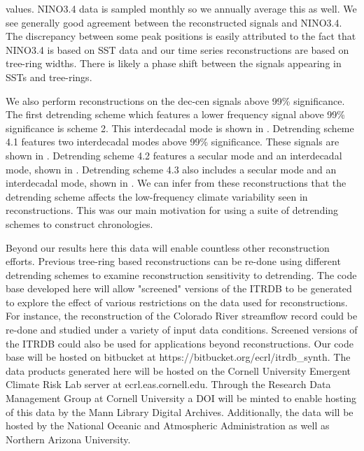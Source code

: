 \documentclass[phd,tocprelim]{cornell}
\begin{document}
values. NINO3.4 data is sampled monthly so we annually average this as well. 
We see generally good agreement between the reconstructed signals 
and NINO3.4. The discrepancy between some peak positions is easily 
attributed to the fact that NINO3.4 is based on SST data and our time 
series reconstructions are based on tree-ring widths. There is likely a 
phase shift between the signals appearing in SSTs and tree-rings. 
\par
We also perform reconstructions on the dec-cen signals above 99\% 
significance. The first detrending scheme which features a lower 
frequency signal above 99\% significance is scheme 2. This interdecadal 
mode is shown in . 
Detrending scheme 4.1 features 
two interdecadal modes above 99\% significance. These signals are shown 
in . 
Detrending scheme 4.2 features a secular mode and an interdecadal mode, 
shown in 
. 
Detrending scheme 4.3 also includes a secular mode and an interdecadal 
mode, shown in 
. 
We can infer from these reconstructions that the detrending scheme 
affects the low-frequency climate variability seen in reconstructions. 
This was our main motivation for using a suite of detrending schemes 
to construct chronologies. 

\par
Beyond our results here this data will enable countless 
other reconstruction efforts. Previous tree-ring based 
reconstructions can be re-done using different detrending 
schemes to examine reconstruction sensitivity to detrending. 
The code base developed here will allow "screened" versions 
of the ITRDB to be generated to explore the effect of 
various restrictions on the data used for reconstructions. 
For instance, the reconstruction of the Colorado River 
streamflow record could be re-done and studied under a variety 
of input data conditions. Screened versions of the ITRDB 
could also be used for applications beyond reconstructions. 
Our code base will be hosted on bitbucket at 
https://bitbucket.org/ecrl/itrdb\_synth. The data products 
generated here will be hosted on the Cornell University 
Emergent Climate Risk Lab server at ecrl.eas.cornell.edu. Through 
the Research Data Management Group at Cornell University a DOI 
will be minted to enable hosting of this data by the Mann 
Library Digital Archives. Additionally, the data will be 
hosted by the National Oceanic and Atmospheric Administration 
as well as Northern Arizona University. 
\end{document}
